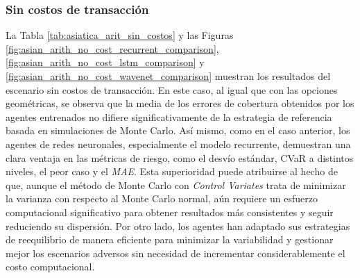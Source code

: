 \documentclass[11pt,a4paper,spanish]{article}
\numberwithin{equation}{section} %
\begin{document}
\subsubsection{Sin costos de transacción}
La Tabla \ref{tab:asiatica_arit_sin_costos} y las Figuras \ref{fig:asian_arith_no_cost_recurrent_comparison}, \ref{fig:asian_arith_no_cost_lstm_comparison} y \ref{fig:asian_arith_no_cost_wavenet_comparison} muestran los resultados del escenario sin costos de transacción. En este caso, al igual que con las opciones geométricas, se observa que la media de los errores de cobertura obtenidos por los agentes entrenados no difiere significativamente de la estrategia de referencia basada en simulaciones de Monte Carlo. Así mismo, como en el caso anterior, los agentes de redes neuronales, especialmente el modelo recurrente, demuestran una clara ventaja en las métricas de riesgo, como el desvío estándar, CVaR a distintos niveles, el peor caso y el \textit{MAE}. Esta superioridad puede atribuirse al hecho de que, aunque el método de Monte Carlo con \textit{Control Variates} trata de minimizar la varianza con respecto al Monte Carlo normal, aún requiere un esfuerzo computacional significativo para obtener resultados más consistentes y seguir reduciendo su dispersión. Por otro lado, los agentes han adaptado sus estrategias de reequilibrio de manera eficiente para minimizar la variabilidad y gestionar mejor los escenarios adversos sin necesidad de incrementar considerablemente el costo computacional. 
\end{document}
